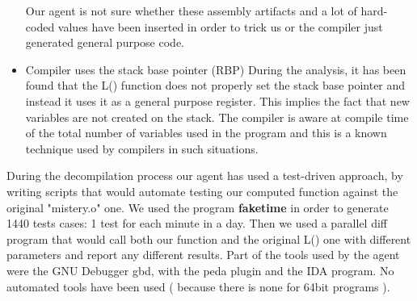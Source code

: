 \begin{itemize}
 Our agent is not sure whether these assembly artifacts and a lot of hard-coded values have been inserted in order to trick us or the compiler just generated general purpose code. 
 \item Compiler uses the stack base pointer (RBP)
 During the analysis, it has been found that the L() function does not properly set the stack base pointer and instead it uses it as a general purpose register. This implies the fact that new variables are not created on the stack. The compiler is aware at compile time of the total number of variables used in the program and this is a known technique used by compilers in such situations. 
  
\end{itemize}

During the decompilation process our agent has used a test-driven approach, by writing scripts that would automate testing our computed function against the original "mistery.o" one. We used the program \textbf{faketime} in order to generate 1440 tests cases: 1 test for each minute in a day. Then we used a parallel diff program that would call both our function and the original L() one with different parameters and report any different results. Part of the tools used by the agent were the GNU Debugger gbd, with the peda plugin and the IDA program. No automated tools have been used ( because there is none for 64bit programs ).